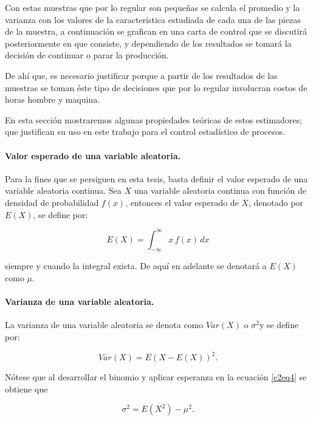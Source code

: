 \documentclass[english]{report}
\begin{document}
Con estas muestras que por lo regular son pequeñas se calcula el promedio
y la varianza con los valores de la característica estudiada de cada
una de las piezas de la muestra, a continuación se grafican en una
carta de control que se discutirá posteriormente en que consiste,
y dependiendo de los resultados se tomará la decisión de continuar
o parar la producción.

De ahí que, es necesario justificar porque a partir de los resultados
de las muestras se toman éste tipo de decisiones que por lo regular involucran
costos de horas hombre y maquina. 

En esta sección mostraremos algunas propiedades teóricas de estos
estimadores; que justifican su uso en este trabajo para el control
estadístico de procesos.


\paragraph{Valor esperado de una variable aleatoria.}

Para la fines que se persiguen en esta tesis, basta definir el valor
esperado de una variable aleatoria continua. Sea $X$ una variable
aleatoria continua con función de densidad de probabilidad $f(x)$,
entonces el valor esperado de $X$, denotado por $E(X)$, se define
por:

\begin{equation}
E(X)=\int_{-\infty}^{\infty}x\,f(x)\,dx
\label{c2eq3}
\end{equation}


siempre y cuando la integral exista. De aquí en adelante se denotará
a $E(X)$ como $\mu.$


\paragraph{Varianza de una variable aleatoria.}

La varianza de una variable aleatoria se denota como $Var(X)$ o $\sigma^{2}$y
se define por:

\begin{equation}
Var(X)=E(X-E(X))^{2}. \label{c2eq4}
\end{equation}


Nótese que al desarrollar el binomio y aplicar esperanza en la ecuación
\ref{c2eq4} se obtiene que

\begin{equation}
\sigma^{2}=E(X^{2})-\mu^{2}.
\label{c2eq5}
\end{equation}
\end{document}
